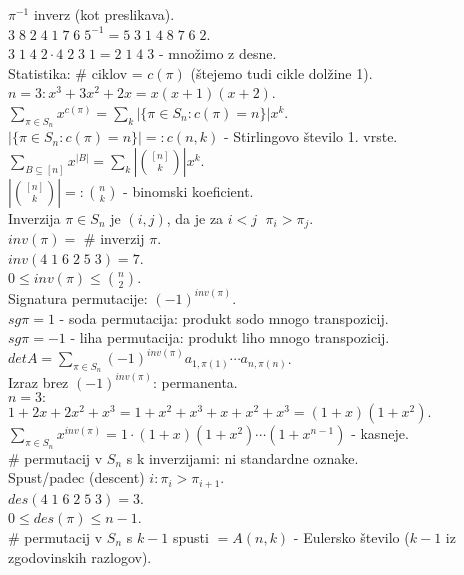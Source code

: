 \documentclass[a4paper, 12pt]{book}
\theoremstyle{definition}
\theoremstyle{remark}
\begin{document}
$\pi^{-1}$ inverz (kot preslikava). \\
$3 \; 8 \; 2 \; 4 \; 1 \; 7 \; 6 \; 5^{-1} = 5 \; 3 \; 1 \; 4 \; 8 \; 7 \; 6 \; 2$. \\
$3 \; 1 \; 4 \; 2 \cdot 4 \; 2 \; 3 \; 1 = 2 \; 1 \; 4 \; 3$ - množimo z desne. \\
Statistika: \# ciklov = $c(\pi)$ (štejemo tudi cikle dolžine 1). \\
$n=3: x^3 + 3 x^2 + 2 x = x(x+1)(x+2)$. \\
$\sum_{\pi \in S_n} x^{c(\pi)} = \sum_k |\{\pi \in S_n: c(\pi) = n\}| x^k$. \\
$|\{\pi \in S_n: c(\pi) = n\}| =: c(n,k)$ - Stirlingovo število 1. vrste. \\
$\sum_{B \subseteq [n]} x^{|B|} = \sum_k \left|\binom{[n]}{k}\right| x^k$. \\
$\left|\binom{[n]}{k}\right| =: \binom{n}{k}$ - binomski koeficient. \\
%
%
%
Inverzija $\pi \in S_n$ je $(i,j)$, da je za $i < j \;$ $\pi_i > \pi_j$. \\
$inv(\pi) = $ \# inverzij $\pi$. \\
$inv(4 \; 1 \; 6 \; 2 \; 5 \; 3) = 7$. \\
$0 \leq inv(\pi) \leq \binom{n}{2}$. \\
Signatura permutacije: $(-1)^{inv(\pi)}$. \\
$sg \pi = 1$ - soda permutacija: produkt sodo mnogo transpozicij. \\
$sg \pi = -1$ - liha permutacija: produkt liho mnogo transpozicij. \\
$det A = \sum_{\pi \in S_n} (-1)^{inv(\pi)} a_{1,\pi(1)} \cdots a_{n,\pi(n)}$. \\
Izraz brez $(-1)^{inv(\pi)}$: permanenta. \\
$n=3:$ \\
$1 + 2 x + 2 x^2 + x^3 = 1 + x^2 + x^3 + x + x^2 + x^3 = (1+x)(1+x^2)$. \\
$\sum_{\pi \in S_n} x^{inv(\pi)} = 1 \cdot (1+x) (1+x^2) \cdots (1+x^{n-1})$ - kasneje. \\
\# permutacij v $S_n$ s k inverzijami: ni standardne oznake. \\
Spust/padec (descent) $i: \pi_i > \pi_{i+1}$. \\
$des(4 \; 1 \; 6 \; 2 \; 5 \; 3) = 3$. \\
$0 \leq des(\pi) \leq n-1$. \\
\# permutacij v $S_n$ s $k-1$ spusti $= A(n,k)$ - Eulersko število ($k-1$ iz zgodovinskih razlogov). \\
\end{document}
